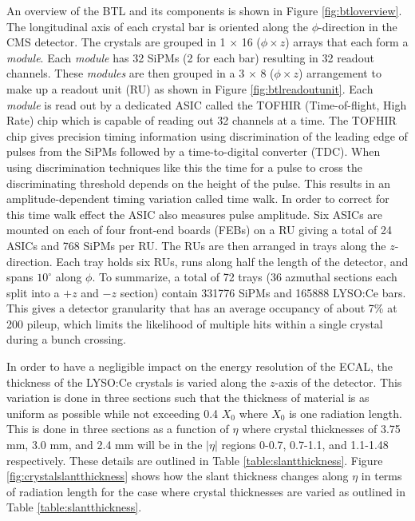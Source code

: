  An overview of the BTL and its components is shown in Figure \ref{fig:btloverview}.  The longitudinal axis of each crystal bar is oriented along the $\phi$-direction in the CMS detector.  The crystals are grouped in 1 $\times$ 16 ($\phi \times z$) arrays that each form a \textit{module}.  Each \textit{module} has 32 SiPMs (2 for each bar) resulting in 32 readout channels.  These \textit{modules} are then grouped in a 3 $\times$ 8 ($\phi \times z$) arrangement to make up a readout unit (RU) as shown in Figure \ref{fig:btlreadoutunit}.  Each \textit{module} is read out by a dedicated ASIC called the TOFHIR (Time-of-flight, High Rate) chip which is capable of reading out 32 channels at a time.  The TOFHIR chip gives precision timing information using discrimination of the leading edge of pulses from the SiPMs followed by a time-to-digital converter (TDC).  When using discrimination techniques like this the time for a pulse to cross the discriminating threshold depends on the height of the pulse.  This results in an amplitude-dependent timing variation called time walk.  In order to correct for this time walk effect the ASIC also measures pulse amplitude. Six ASICs are mounted on each of four front-end boards (FEBs) on a RU giving a total of 24 ASICs and 768 SiPMs per RU.  The RUs are then arranged in trays along the $z$-direction.  Each tray holds six RUs, runs along half the length of the detector, and spans $10^\circ$ along $\phi$.  To summarize, a total of 72 trays (36 azmuthal sections each split into a $+z$ and $-z$ section) contain 331776 SiPMs and 165888 LYSO:Ce bars.  This gives a detector granularity that has an average occupancy of about 7\% at 200 pileup, which limits the likelihood of multiple hits within a single crystal during a bunch crossing.  
 
 In order to have a negligible impact on the energy resolution of the ECAL, the thickness of the LYSO:Ce crystals is varied along the $z$-axis of the detector.  This variation is done in three sections such that the thickness of material is as uniform as possible while not exceeding 0.4 $X_0$ where $X_0$ is one radiation length.  This is done in three sections as a function of $\eta$ where crystal thicknesses of 3.75 mm, 3.0 mm, and 2.4 mm will be in the $|\eta|$ regions 0-0.7, 0.7-1.1, and 1.1-1.48 respectively.  These details are outlined in Table \ref{table:slantthickness}.  Figure \ref{fig:crystalslantthickness} shows how the slant thickness changes along $\eta$ in terms of radiation length for the case where crystal thicknesses are varied as outlined in Table \ref{table:slantthickness}.  
 
